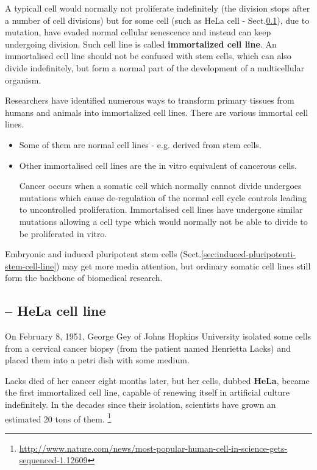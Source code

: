 A typicall cell would normally not proliferate indefinitely (the division stops
after a number of cell divisions) but for some cell (such as HeLa cell -
Sect.\ref{sec:HeLa-cell-line}), due to mutation, have evaded normal cellular
senescence and instead can keep undergoing division. Such cell line is called
{\bf immortalized cell line}.
An immortalised cell line should not be confused with stem cells, which can also
divide indefinitely, but form a normal part of the development of a
multicellular organism.

Researchers have identified numerous ways to transform primary tissues from
humans and animals into immortalized cell lines.
There are various immortal cell lines. 
\begin{itemize}
  \item Some of them are normal cell lines - e.g. derived from stem cells. 

   \item Other immortalised cell lines are the in vitro equivalent of cancerous
   cells.

Cancer occurs when a somatic cell which normally cannot divide undergoes
mutations which cause de-regulation of the normal cell cycle controls leading to
uncontrolled proliferation. Immortalised cell lines have undergone similar
mutations allowing a cell type which would normally not be able to divide to be
proliferated in vitro.

\end{itemize}

Embryonic and induced pluripotent stem cells
(Sect.\ref{sec:induced-pluripotenti-stem-cell-line}) may get more media
attention, but ordinary somatic cell lines still form the backbone of biomedical
research.


 
\subsection{-- HeLa cell line}
\label{sec:HeLa-cell-line}
\label{sec:cell-line-HeLa}

On February 8, 1951, George Gey of Johns Hopkins University isolated some cells
from a cervical cancer biopsy (from the patient named Henrietta Lacks) and
placed them into a petri dish with some medium.

Lacks died of her cancer eight months later, but her cells, dubbed {\bf HeLa},
became the first immortalized cell line, capable of renewing itself in
artificial culture indefinitely.
In the decades since their isolation, scientists have grown an estimated 20
tons of them.
\footnote{\url{http://www.nature.com/news/most-popular-human-cell-in-science-gets-sequenced-1.12609}}

